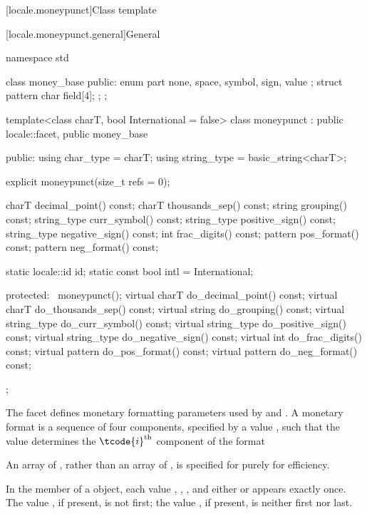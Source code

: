[locale.moneypunct]{Class template }

[locale.moneypunct.general]{General}

%
\begin{codeblock}
namespace std {
  class money_base {
  public:
    enum part { none, space, symbol, sign, value };
    struct pattern { char field[4]; };
  };

  template<class charT, bool International = false>
    class moneypunct : public locale::facet, public money_base {
    public:
      using char_type   = charT;
      using string_type = basic_string<charT>;

      explicit moneypunct(size_t refs = 0);

      charT        decimal_point() const;
      charT        thousands_sep() const;
      string       grouping()      const;
      string_type  curr_symbol()   const;
      string_type  positive_sign() const;
      string_type  negative_sign() const;
      int          frac_digits()   const;
      pattern      pos_format()    const;
      pattern      neg_format()    const;

      static locale::id id;
      static const bool intl = International;

    protected:
      ~moneypunct();
      virtual charT        do_decimal_point() const;
      virtual charT        do_thousands_sep() const;
      virtual string       do_grouping()      const;
      virtual string_type  do_curr_symbol()   const;
      virtual string_type  do_positive_sign() const;
      virtual string_type  do_negative_sign() const;
      virtual int          do_frac_digits()   const;
      virtual pattern      do_pos_format()    const;
      virtual pattern      do_neg_format()    const;
    };
}
\end{codeblock}

\pnum
The  facet defines monetary formatting parameters
used by  and .
A monetary format is a sequence of four components,
specified by a  value ,
such that the  value 
determines the $\tcode{i}^\text{th}$ component of the format
\begin{footnote}
An array of ,
rather than an array of ,
is specified for  purely for efficiency.
\end{footnote}
In the  member of a  object,
each value , , , and
either  or 
appears exactly once.
The value , if present, is not first;
the value , if present, is neither first nor last.

